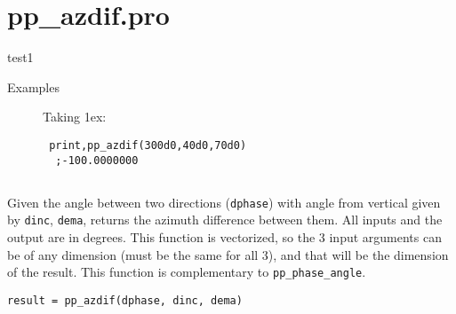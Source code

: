 \section{pp\_azdif.pro}







\noindent  test1
 
 
 




\begin{description}
  \item[Examples]\hspace*{1em} \newline     Taking 1ex:
 \begin{verbatim} print,pp_azdif(300d0,40d0,70d0)
  ;-100.0000000
 \end{verbatim}
 
\end{description}
















\subsection*{}

\marginnote{}


\noindent     Given the angle between two directions ({\tt dphase}) with angle from vertical
     given by {\tt dinc}, {\tt dema}, returns the azimuth difference between them. All inputs
     and the output are in degrees. This function is vectorized, so the 3 input arguments
     can be of any dimension (must be the same for all 3), and that will be the dimension of the
     result.
     This function is complementary to {\tt pp\_phase\_angle}.
 
 
 
\vspace{1.1em}


\begin{syntaxheader}
\lstinline+result = pp_azdif(dphase, dinc, dema)+
\end{syntaxheader}




